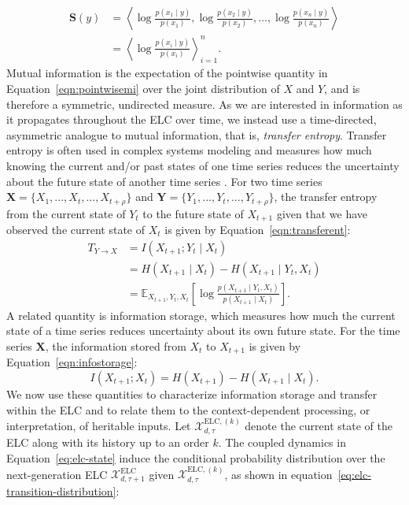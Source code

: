 \documentclass[pdflatex,sn-mathphys-num]{sn-jnl}
\theoremstyle{thmstylethree}
\theoremstyle{thmstyleone}
\newcommand{\ELC}{\mathrm{ELC}}
\begin{document}
\begin{align}
\label{eqn:s-vector}
    \mathbf{S}(y)
    &=
    \left\langle
        \log\frac{p(x_1\mid y)}{p(x_1)},
        \log\frac{p(x_2\mid y)}{p(x_2)},
        \ldots,
        \log\frac{p(x_n\mid y)}{p(x_n)}
    \right\rangle \\
    &=
    \left\langle
        \log\frac{p(x_i\mid y)}{p(x_i)}
    \right\rangle_{i=1}^{n}.
\end{align}
Mutual information is the expectation of the pointwise quantity in Equation~\ref{eqn:pointwisemi} over the joint distribution of $X$ and $Y$, and is therefore a symmetric, undirected measure. As we are interested in information as it propagates throughout the ELC over time, we instead use a time-directed, asymmetric analogue to mutual information, that is, \textit{transfer entropy}. Transfer entropy is often used in complex systems modeling and measures how much knowing the current and/or past states of one time series reduces the uncertainty about the future state of another time series \cite{lizier2014jidt}. For two time series $\mathbf{X} = \{X_{1},...,X_{t},...,X_{t + \rho}\}$ and $\mathbf{Y} = \{Y_{1},...,Y_{t},...,Y_{t + \rho}\}$, the transfer entropy from the current state of $Y_{t}$ to the future state of $X_{t+1}$ given that we have observed the current state of $X_{t}$ is given by Equation~\ref{eqn:transferent}:
\begin{align}
\label{eqn:transferent}
    T_{Y \to X}
        &= I(X_{t+1}; Y_t \mid X_t) \\
        &= H(X_{t+1} \mid X_t) - H(X_{t+1} \mid Y_t, X_t) \\
        &= \mathbb{E}_{X_{t+1},Y_t,X_t}
        \left[
        \log
        \frac{
        p(X_{t+1} \mid Y_t, X_t)
        }{
        p(X_{t+1} \mid X_t)
        }
        \right].
\end{align}
A related quantity is information storage, which measures how much the current state of a time series reduces uncertainty about its own future state. For the time series $\mathbf{X}$, the information stored from $X_t$ to $X_{t+1}$ is given by Equation~\ref{eqn:infostorage}:
\begin{equation}
\label{eqn:infostorage}
    I(X_{t+1}; X_t) = H(X_{t+1}) - H(X_{t+1} \mid X_t).
\end{equation}
We now use these quantities to characterize information storage and transfer within the ELC and to relate them to the context-dependent processing, or interpretation, of heritable inputs. Let $\mathcal{X}_{d,\tau}^{\ELC,(k)}$ denote the current state of the ELC along with its history up to an order $k$. The coupled dynamics in Equation~\ref{eq:elc-state} induce the conditional probability distribution over the next-generation ELC $\mathcal{X}_{d,\tau+1}^{\text{ELC}}$ given $\mathcal{X}_{d,\tau}^{\ELC,(k)}$, as shown in equation~\eqref{eq:elc-transition-distribution}:
\end{document}
